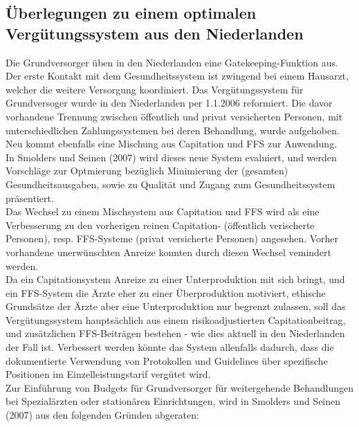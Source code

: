 \documentclass[ngerman,a4paper]{article}
\begin{document}
\subsection{Überlegungen zu einem optimalen Vergütungssystem aus den
Niederlanden}\label{uberlegungen-zu-einem-optimalen-vergutungssystem-aus-den-niederlanden}

Die Grundversorger üben in den Niederlanden eine Gatekeeping-Funktion
aus. Der erste Kontakt mit dem Gesundheitssystem ist zwingend bei einem
Hausarzt, welcher die weitere Versorgung koordiniert. Das
Vergütungssystem für Grundversoger wurde in den Niederlanden per
1.1.2006 reformiert. Die davor vorhandene Trennung zwischen öffentlich
und privat versicherten Personen, mit unterschiedlichen Zahlungssystemen
bei deren Behandlung, wurde aufgehoben. Neu kommt ebenfalls eine
Mischung aus Capitation und FFS zur Anwendung.\\
In Smolders und Seinen (2007) wird dieses neue System evaluiert, und
werden Vorschläge zur Optmierung bezüglich Minimierung der (gesamten)
Gesundheitsausgaben, sowie zu Qualität und Zugang zum Gesundheitssystem
präsentiert.\\
Das Wechsel zu einem Mischsystem aus Capitation und FFS wird als eine
Verbesserung zu den vorherigen reinen Capitation- (öffentlich
verischerte Personen), resp. FFS-Systeme (privat versicherte Personen)
angesehen. Vorher vorhandene unerwünschten Anreize konnten durch diesen
Wechsel vemindert werden.\\
Da ein Capitationsystem Anreize zu einer Unterproduktion mit sich
bringt, und ein FFS-System die Ärzte eher zu einer Überproduktion
motiviert, ethische Grundsätze der Ärzte aber eine Unterproduktion nur
begrenzt zulassen, soll das Vergütungssystem hauptsächlich aus einem
risikoadjustierten Capitationbeitrag, und zusätzlichen FFS-Beiträgen
bestehen - wie dies aktuell in den Niederlanden der Fall ist. Verbessert
werden könnte das System allenfalls dadurch, dass die dokumentierte
Verwendung von Protokollen und Guidelines über spezifische Positionen im
Einzelleistungstarif vergütet wird.\\
Zur Einführung von Budgets für Grundversorger für weitergehende
Behandlungen bei Spezialärzten oder stationären Einrichtungen, wird in
Smolders und Seinen (2007) aus den folgenden Gründen abgeraten:
\end{document}

